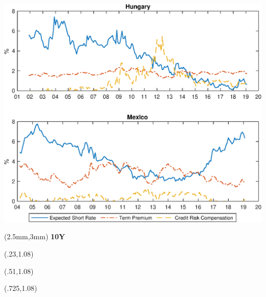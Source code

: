 \documentclass[12pt, aspectratio=169, xcolor=dvipsnames]{beamer}
\begin{document}
\begin{frame}[label=YldDcmp2]
\begin{center}							%
\includegraphics[trim={0cm 0cm 0cm 0cm},clip,height=0.95\textheight,width=\linewidth]{../Figures/Estimation/HUF_MXN_dcmp.eps} \\
\end{center}
\begin{textblock*}{15cm}(2.5mm,3mm)
	\textbf{10Y}
\end{textblock*}
\begin{textblock*}{3cm}(.23\textwidth,1.08\textheight)
	\hyperlink{YldDcmp10}{}
\end{textblock*}
\begin{textblock*}{3cm}(.51\textwidth,1.08\textheight)
\hyperlink{tpCI}{}
\end{textblock*}
\begin{textblock*}{5cm}(.725\textwidth,1.08\textheight)
\hyperlink{crcCI}{}
\end{textblock*}
\end{frame}
\end{document}
